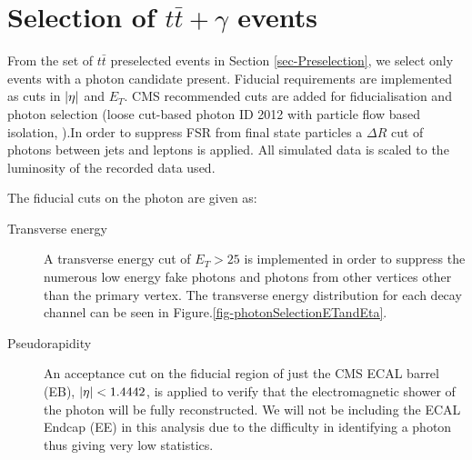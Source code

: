 
\section{Selection of $t\bar{t}+\gamma$ events} \label{sec-postselection}

From the set of $t\bar{t}$ preselected events in Section \ref{sec-Preselection}, we select only events with a photon candidate present.  Fiducial requirements are implemented as cuts in $\lvert \eta \rvert$ and $E_T$. CMS recommended cuts are added for fiducialisation and photon selection (loose cut-based photon ID 2012 with particle flow based isolation, \cite{CutBasedIsolation2012}).In order to suppress FSR from final state particles a $\Delta R$ cut of photons between jets and leptons is applied. All simulated data is scaled to the luminosity of the recorded data used.  

The fiducial cuts on the photon are given as:

\begin{description}

\item[Transverse energy] A transverse energy cut of $E_T > 25$ is implemented in order to suppress the numerous low energy fake photons and photons from other vertices other than the primary
vertex. The transverse energy distribution for each decay channel can be seen in Figure.\ref{fig-photonSelectionETandEta}.

\item[Pseudorapidity] An acceptance cut on the fiducial region of just the CMS ECAL barrel (EB), $\lvert \eta \rvert < 1.4442$, is applied to verify that the electromagnetic shower of the photon will be fully reconstructed. We will not be including the ECAL Endcap (EE) in this analysis due to the difficulty in identifying a photon thus giving very low statistics.

\end{description}

